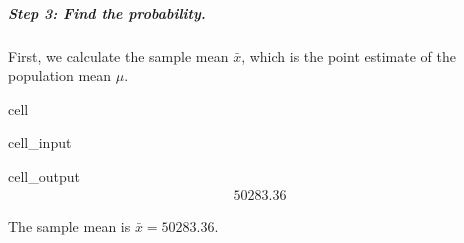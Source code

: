 \documentclass[letterpaper,10pt,english]{jupyterBook}
\begin{document}
\subparagraph{Step 3: Find the probability.}
\label{\detokenize{Ch6 An Introduction to Hypothesis Testing/6.1 An Introduction to Hypothesis Testing:step-3-find-the-probability}}
\sphinxAtStartPar
First, we calculate the sample mean \(\bar{x}\), which is the point estimate of the population mean \(\mu\).

\begin{sphinxuseclass}{cell}\begin{sphinxVerbatimInput}

\begin{sphinxuseclass}{cell_input}
\begin{sphinxVerbatim}[commandchars=\\\{\}]

\end{sphinxVerbatim}

\end{sphinxuseclass}\end{sphinxVerbatimInput}
\begin{sphinxVerbatimOutput}

\begin{sphinxuseclass}{cell_output}\begin{equation*}
\begin{split}50283.36\end{split}
\end{equation*}
\end{sphinxuseclass}\end{sphinxVerbatimOutput}

\end{sphinxuseclass}
\sphinxAtStartPar
The sample mean is \(\bar{x} = 50283.36\).
\end{document}
